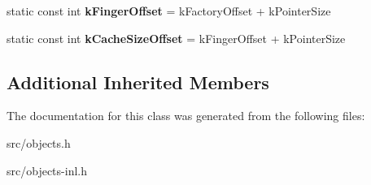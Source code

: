 \begin{DoxyCompactItemize}
\item 
\hypertarget{classv8_1_1internal_1_1_j_s_function_result_cache_af37292d7fea82773ccfc905f72bc3a21}{}static const int {\bfseries k\+Finger\+Offset} = k\+Factory\+Offset + k\+Pointer\+Size\label{classv8_1_1internal_1_1_j_s_function_result_cache_af37292d7fea82773ccfc905f72bc3a21}

\item 
\hypertarget{classv8_1_1internal_1_1_j_s_function_result_cache_a598944bf57ad474aef7014ffbac84e2e}{}static const int {\bfseries k\+Cache\+Size\+Offset} = k\+Finger\+Offset + k\+Pointer\+Size\label{classv8_1_1internal_1_1_j_s_function_result_cache_a598944bf57ad474aef7014ffbac84e2e}

\end{DoxyCompactItemize}
\subsection*{Additional Inherited Members}


The documentation for this class was generated from the following files\+:\begin{DoxyCompactItemize}
\item 
src/objects.\+h\item 
src/objects-\/inl.\+h\end{DoxyCompactItemize}
